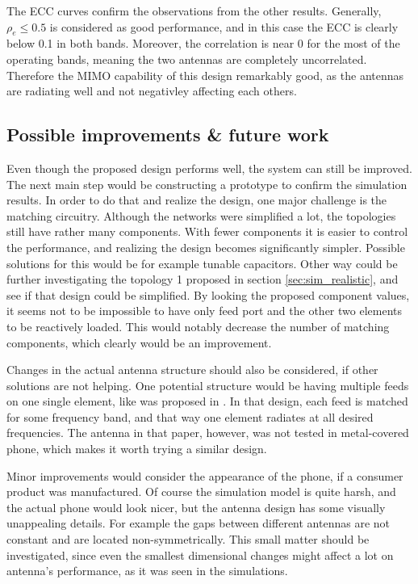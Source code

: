 The ECC curves confirm the observations from the other results. Generally, $\rho_e\leq0.5$ is considered as good performance, and in this case the ECC is clearly below 0.1 in both bands. Moreover, the correlation is near 0 for the most of the operating bands, meaning the two antennas are completely uncorrelated. Therefore the MIMO capability of this design remarkably good, as the antennas are radiating well and not negativley affecting each others.

\subsection{Possible improvements \& future work}
\label{sec:improvements}
Even though the proposed design performs well, the system can still be improved. The next main step would be constructing a prototype to confirm the simulation results. In order to do that and realize the design, one major challenge is the matching circuitry. Although the networks were simplified a lot, the topologies still have rather many components. With fewer components it is easier to control the performance, and realizing the design becomes significantly simpler. Possible solutions for this would be for example tunable capacitors. Other way could be further investigating the topology 1 proposed in section \ref{sec:sim_realistic}, and see if that design could be simplified. By looking the proposed component values, it seems not to be impossible to have only feed port and the other two elements to be reactively loaded. This would notably decrease the number of matching components, which clearly would be an improvement.

Changes in the actual antenna structure should also be considered, if other solutions are not helping. One potential structure would be having multiple feeds on one single element, like was proposed in \cite{valkonen_multifeed}. In that design, each feed is matched for some frequency band, and that way one element radiates at all desired frequencies. The antenna in that paper, however, was not tested in metal-covered phone, which makes it worth trying a similar design.

Minor improvements would consider the appearance of the phone, if a consumer product was manufactured. Of course the simulation model is quite harsh, and the actual phone would look nicer, but the antenna design has some visually unappealing details. For example the gaps between different antennas are not constant and are located non-symmetrically. This small matter should be investigated, since even the smallest dimensional changes might affect a lot on antenna's performance, as it was seen in the simulations.

